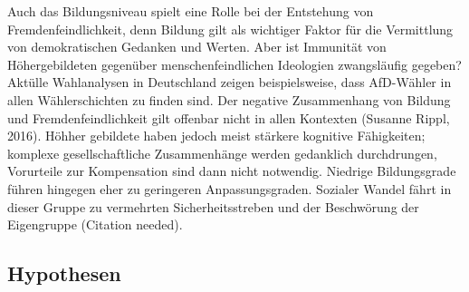 \documentclass[]{article}
\begin{document}
Auch das Bildungsniveau spielt eine Rolle bei der Entstehung von
Fremdenfeindlichkeit, denn Bildung gilt als wichtiger Faktor für die
Vermittlung von demokratischen Gedanken und Werten. Aber ist Immunität
von Höhergebildeten gegenüber menschenfeindlichen Ideologien
zwangsläufig gegeben? Aktülle Wahlanalysen in Deutschland zeigen
beispielsweise, dass AfD-Wähler in allen Wählerschichten zu finden sind.
Der negative Zusammenhang von Bildung und Fremdenfeindlichkeit gilt
offenbar nicht in allen Kontexten (Susanne Rippl, 2016). Höhher
gebildete haben jedoch meist stärkere kognitive Fähigkeiten; komplexe
gesellschaftliche Zusammenhänge werden gedanklich durchdrungen,
Vorurteile zur Kompensation sind dann nicht notwendig. Niedrige
Bildungsgrade führen hingegen eher zu geringeren Anpassungsgraden.
Sozialer Wandel fährt in dieser Gruppe zu vermehrten Sicherheitsstreben
und der Beschwörung der Eigengruppe (Citation needed).

\subsection{Hypothesen}\label{hypothesen}
\end{document}
